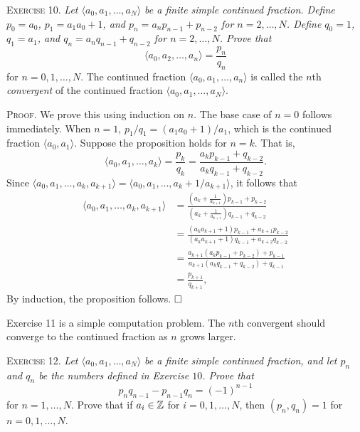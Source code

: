 \documentclass[11pt, leqno]{article}
\newcommand{\done}{\ensuremath{\hfill\square}}
\begin{document}
\textsc{Exercise 10}. \emph{Let $\langle a_0, a_1,\ldots,a_N \rangle$ be a finite simple continued fraction. Define $p_0 = a_0$, $p_1 = a_1a_0+1$, and $p_n = a_np_{n-1} + p_{n-2}$ for $n=2,\ldots, N$. Define $q_0=1$, $q_1=a_1$, and $q_n = a_nq_{n-1} + q_{n-2}$ for $n=2,\ldots, N$. Prove that 
\begin{displaymath}
\langle a_0, a_2,\ldots,a_n \rangle = \frac{p_n}{q_n}
\end{displaymath}}for $n=0,1,\ldots, N$. The continued fraction $\langle a_0, a_1,\ldots,a_n \rangle $ is called the $n$th \emph{convergent} of the continued fraction $\langle a_0, a_1, \ldots, a_N\rangle$.

\textsc{Proof}. We prove this using induction on $n$. The base case of $n=0$ follows immediately. When $n=1$, $p_1/q_1 = (a_1a_0+1)/a_1$, which is the continued fraction $\langle a_0, a_1 \rangle$. Suppose the proposition holds for $n=k$. That is, 
\begin{displaymath}
\langle a_0, a_1, \ldots, a_k \rangle = \frac{p_k}{q_k} = \frac{a_kp_{k-1} + q_{k-2}}{a_kq_{k-1} + q_{k-2}}.
\end{displaymath}
Since $\langle a_0, a_1, \ldots, a_k, a_{k+1} \rangle = \langle a_0, a_1, \ldots, a_k+1/a_{k+1} \rangle$, it follows that
\begin{align*}
  \langle a_0, a_1, \ldots, a_k, a_{k+1} \rangle &= \frac{\left( a_k+\frac{1}{a_{k+1}} \right)p_{k-1} + p_{k-2}}{\left( a_k+\frac{1}{a_{k+1}} \right)q_{k-1} + q_{k-2}} \\
                                                            &= \frac{(a_ka_{k+1} + 1)p_{k-1} + a_{k+1}p_{k-2}}{(a_ka_{k+1} + 1)q_{k-1} + a_{k+2}q_{k-2}} \\
                                                            &= \frac{a_{k+1}(a_kp_{k-1} + p_{k-2}) + p_{k-1}}{a_{k+1}(a_kq_{k-1} + q_{k-2}) + q_{k-1}} \\
  &= \frac{p_{k+1}}{q_{k+1}},
\end{align*}
By induction, the proposition follows. \done

Exercise 11 is a simple computation problem. The $n$th convergent should converge to the continued fraction as $n$ grows larger.

\textsc{Exercise 12}. \emph{Let $\langle a_0, a_1, \ldots, a_N\rangle$ be a finite simple continued fraction, and let $p_n$ and $q_n$ be the numbers defined in Exercise $10$. Prove that 
\begin{displaymath}
p_nq_{n-1} - p_{n-1}q_n = (-1)^{n-1}
\end{displaymath}}for $n=1,\ldots, N$. Prove that if $a_i \in \mathbb{Z}$ for $i=0,1,\ldots, N$, then $(p_n, q_n) = 1$ for $n=0,1,\ldots, N$.
\end{document}
